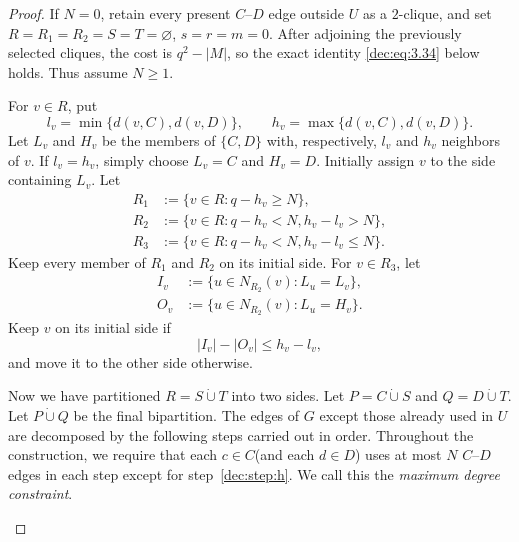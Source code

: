 \documentclass[11pt]{article}
\numberwithin{equation}{section}
\theoremstyle{remark}
\newcommand{\dotcupunion}{\mathbin{\dot\cup}}
\begin{document}
\begin{proof}
If \(N=0\), retain every present \(C\)--\(D\) edge outside \(U\) as a
\(2\)-clique, and set \(R=R_1=R_2=S=T=\varnothing\), \(s=r=m=0\).
After adjoining the previously selected cliques, the cost is \(q^2-|M|\), so
the exact identity \eqref{dec:eq:3.34} below holds.  Thus assume \(N\ge1\).

For \(v\in R\), put
\begin{equation*}
  l_v=\min\{d(v,C),d(v,D)\},\qquad
  h_v=\max\{d(v,C),d(v,D)\}.
\end{equation*}
Let \(L_v\) and \(H_v\) be the members of \(\{C,D\}\) with, respectively, \(l_v\) and \(h_v\) neighbors of \(v\).
If \(l_v=h_v\), simply choose \(L_v=C\) and \(H_v=D\). Initially assign \(v\) to the side containing \(L_v\). Let
\begin{equation}\label{dec:eq:def R1R2R3}
  \begin{aligned}
    R_1 &:= \{v\in R:q-h_v\ge N\},\\
    R_2 &:= \{v\in R:q-h_v<N, h_v-l_v> N\},\\
    R_3 &:= \{v\in R:q-h_v<N, h_v-l_v\le N\}.
  \end{aligned}
\end{equation}
Keep every member of \(R_1\) and \(R_2\) on its initial side. For \(v\in R_3\), let
\begin{equation*}
  \begin{aligned}
    I_v &:= \{u\in N_{R_2}(v):L_u=L_v\},\\
    O_v &:= \{u\in N_{R_2}(v):L_u=H_v\}.
  \end{aligned}
\end{equation*}
Keep \(v\) on its initial side if
\begin{equation*}
  |I_v|-|O_v|\le h_v-l_v,
\end{equation*}
and move it to the other side otherwise.

Now we have partitioned \(R=S\dotcupunion T\) into two sides. Let \(P=C\dotcupunion S\) and \(Q=D\dotcupunion T\).
Let \(P\dotcupunion Q\) be the final bipartition. The edges of \(G\) except those already used in \(U\) are decomposed
by the following steps carried out in order. Throughout the construction, we require that each \(c\in C\)(and each \(d\in D\))
uses at most \(N\) \(C\)--\(D\) edges in each step except for step~\ref{dec:step:h}.
We call this the \emph{maximum degree constraint}.

\begin{enumerate}[label=\textup{(\alph*)}]


\end{enumerate}
\end{proof}
\end{document}
